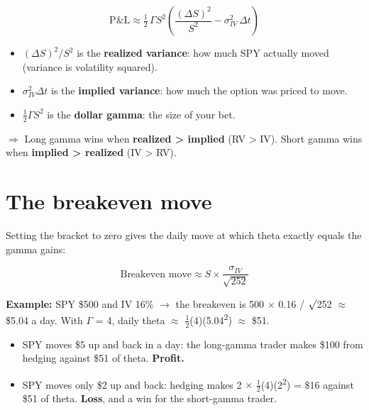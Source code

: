 \documentclass{article}
\begin{document}
\[\text{P\&L} \approx \tfrac{1}{2}\,\Gamma S^2 \left( \frac{(\Delta S)^2}{S^2} - \sigma_{IV}^2\, \Delta t \right)\]

\begin{itemize}

\item $(\Delta S)^2/S^2$ is the \textbf{realized variance}: how much SPY actually moved (variance is volatility squared).

\item $\sigma_{IV}^2 \Delta t$ is the \textbf{implied variance}: how much the option was priced to move.

\item $\tfrac{1}{2}\Gamma S^2$ is the \textbf{dollar gamma}: the size of your bet.

\end{itemize}

\textbf{$\Rightarrow$} Long gamma wins when \textbf{realized > implied} (RV > IV). Short gamma wins when \textbf{implied > realized} (IV > RV).

\section{The breakeven move}

Setting the bracket to zero gives the daily move at which theta exactly equals the gamma gains:

\[\text{Breakeven move} \approx S \times \frac{\sigma_{IV}}{\sqrt{252}}\]

\textbf{Example:} SPY \$500 and IV 16\% \ensuremath{\rightarrow} the breakeven is 500 \ensuremath{\times} 0.16 /\allowbreak{} \ensuremath{\surd}252 \ensuremath{\approx} \$5.04 a day. With \ensuremath{\Gamma} = 4, daily theta \ensuremath{\approx} \ensuremath{\frac12}(4)(5.04\textsuperscript{2}) \ensuremath{\approx} \$51.

\begin{itemize}

\item SPY moves \$5 up and back in a day: the long-gamma trader makes \$100 from hedging against \$51 of theta. \textbf{Profit.}

\item SPY moves only \$2 up and back: hedging makes 2 \ensuremath{\times} \ensuremath{\frac12}(4)(2\textsuperscript{2}) = \$16 against \$51 of theta. \textbf{Loss}, and a win for the short-gamma trader.

\end{itemize}
\end{document}
